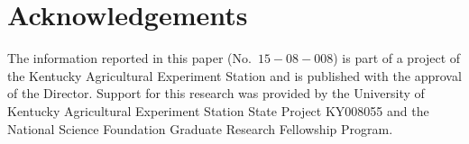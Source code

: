\section{Acknowledgements}
\label{sec:acknowledge}

The information reported in this paper (No.\ $15-08-008$) is part of a project of the Kentucky Agricultural Experiment Station and is published with the approval of the Director.  Support for this research was provided by the University of Kentucky Agricultural Experiment Station State Project KY008055 and the National Science Foundation Graduate Research Fellowship Program.


